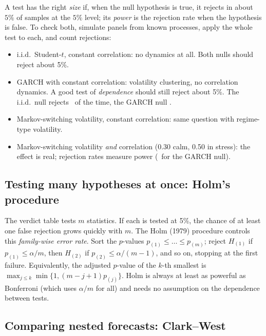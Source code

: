 A test has the right \emph{size} if, when the null hypothesis is true, it
rejects in about $5\%$ of samples at the $5\%$ level; its \emph{power} is the
rejection rate when the hypothesis is false. To check both, simulate panels
from known processes, apply the whole test to each, and count rejections:
\begin{itemize}
\item i.i.d.\ Student-$t$, constant correlation: no dynamics at all. Both
nulls should reject about 5\%.
\item GARCH with constant correlation: volatility clustering, no
correlation dynamics. A good test of \emph{dependence} should still reject
about 5\%. The i.i.d.\ null rejects \MCGARCHIID\ of the time, the GARCH null
\MCGARCHFHS.
\item Markov-switching volatility, constant correlation: same question with
regime-type volatility.
\item Markov-switching volatility \emph{and} correlation (0.30 calm, 0.50 in
stress): the effect is real; rejection rates measure power
(\MCPOWFHS\ for the GARCH null).
\end{itemize}

\subsection{Testing many hypotheses at once: Holm's procedure}

The verdict table tests $m$ statistics. If each is tested at 5\%, the chance
of at least one false rejection grows quickly with $m$. The Holm (1979)
procedure controls this \emph{family-wise error rate}. Sort the $p$-values
$p_{(1)}\le\dots\le p_{(m)}$; reject $H_{(1)}$ if $p_{(1)}\le\alpha/m$, then
$H_{(2)}$ if $p_{(2)}\le\alpha/(m-1)$, and so on, stopping at the first
failure. Equivalently, the adjusted $p$-value of the $k$-th smallest is
$\max_{j\le k}\min\{1,(m-j+1)p_{(j)}\}$. Holm is always at least as powerful
as Bonferroni (which uses $\alpha/m$ for all) and needs no assumption on the
dependence between tests.

\subsection{Comparing nested forecasts: Clark--West}

